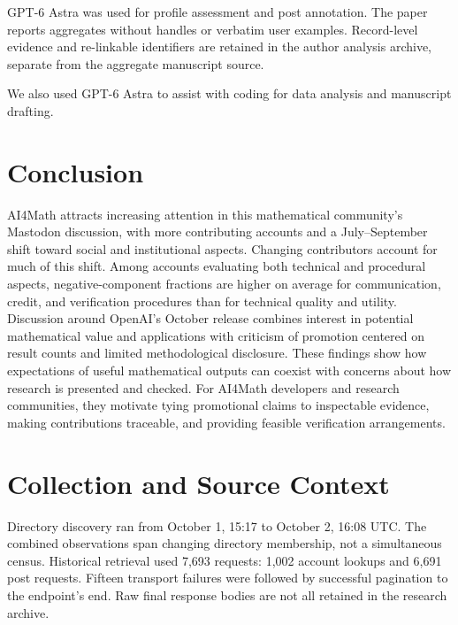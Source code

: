\documentclass[sigconf,balance=false]{acmart}
\begin{document}
GPT-6 Astra was used for profile assessment and post annotation. The paper reports aggregates without handles or verbatim user examples. Record-level evidence and re-linkable identifiers are retained in the author analysis archive, separate from the aggregate manuscript source. 

We also used GPT-6 Astra to assist with coding for data analysis and manuscript drafting.

\section{Conclusion}
AI4Math attracts increasing attention in this mathematical community's Mastodon discussion, with more contributing accounts and a July--September shift toward social and institutional aspects. Changing contributors account for much of this shift. Among accounts evaluating both technical and procedural aspects, negative-component fractions are higher on average for communication, credit, and verification procedures than for technical quality and utility. Discussion around OpenAI's October release combines interest in potential mathematical value and applications with criticism of promotion centered on result counts and limited methodological disclosure. These findings show how expectations of useful mathematical outputs can coexist with concerns about how research is presented and checked. For AI4Math developers and research communities, they motivate tying promotional claims to inspectable evidence, making contributions traceable, and providing feasible verification arrangements.

\label{end:main}
\label{start:references}


\appendix

\section{Collection and Source Context}\label{app:collection}
Directory discovery ran from October 1, 15:17 to October 2, 16:08 UTC. The combined observations span changing directory membership, not a simultaneous census. Historical retrieval used 7,693 requests: 1,002 account lookups and 6,691 post requests. Fifteen transport failures were followed by successful pagination to the endpoint's end. Raw final response bodies are not all retained in the research archive.
\end{document}
